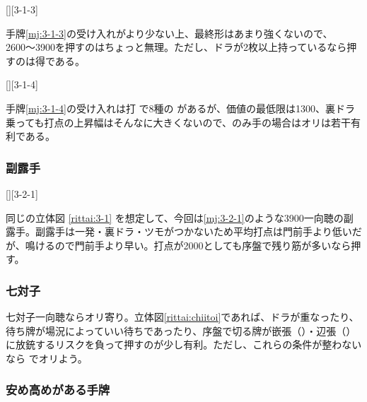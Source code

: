 \documentclass[10pt, twocolumn]{article}
\begin{document}
[][3-1-3]

手牌\ref{mj:3-1-3}の受け入れがより少ない上、最終形はあまり強くないので、2600〜3900を押すのはちょっと無理。ただし、ドラが2枚以上持っているなら押すのは得である\citep[][pp. 26--29]{tetsuoshi}。

[][3-1-4]

手牌\ref{mj:3-1-4}の受け入れは打  で8種の  があるが、価値の最低限は1300、裏ドラ乗っても打点の上昇幅はそんなに大きくないので、のみ手の場合はオリは若干有利である\citep[][pp. 30--35]{tetsuoshi}。

\subsubsection*{副露手}

[][3-2-1]

同じの立体図 \ref{rittai:3-1} を想定して、今回は\ref{mj:3-2-1}のような3900一向聴の副露手。副露手は一発・裏ドラ・ツモがつかないため平均打点は門前手より低いだが、鳴けるので門前手より早い。打点が2000としても序盤で残り筋が多いなら押す\citep[][pp. 46--49]{tetsuoshi}。

\subsubsection*{七対子}

\begin{rittai}[h]
  \centering
  
  
  \caption{序盤で自分の手牌が七対子一向聴の場合}
  \label{rittai:chiitoi}
\end{rittai}

七対子一向聴ならオリ寄り。立体図\ref{rittai:chiitoi}であれば、ドラが重なったり、待ち牌が場況によっていい待ちであったり、序盤で切る牌が嵌張（）・辺張（）に放銃するリスクを負って押すのが少し有利。ただし、これらの条件が整わないなら  でオリよう\citep[][pp. 50--55]{tetsuoshi}。

\subsubsection*{安め高めがある手牌}
\end{document}
